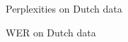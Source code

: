 \documentclass[department=cls, grouplogo=lama, notes={hide notes}, slidesperpage=1, official=true]{beamerruhuisstijl}
\begin{document}
\begin{frame}{Perplexities on Dutch data}
\end{frame}

\begin{frame}{WER on Dutch data}

\end{frame}

\begin{frame}{}

\end{frame}
\end{document}
